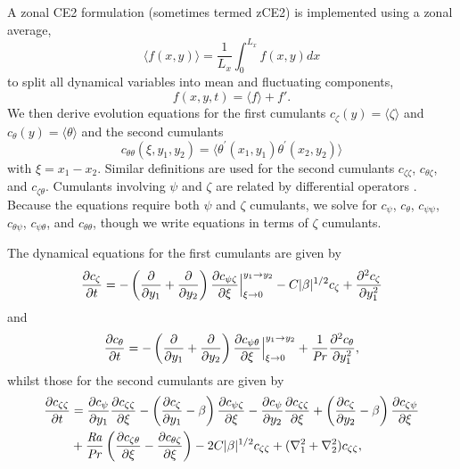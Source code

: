 \documentclass{jfm}
\newcommand{\cz}{c_{\zeta}}
\newcommand{\cs}{c_{\psi}}
\newcommand{\ct}{c_{\theta}}
\newcommand{\css}{c_{\psi \psi}}
\newcommand{\csz}{c_{\psi \zeta}}
\newcommand{\czs}{c_{\zeta \psi}}
\newcommand{\czz}{c_{\zeta \zeta}}
\newcommand{\ctz}{c_{\theta \zeta}}
\newcommand{\czt}{c_{\zeta \theta}}
\newcommand{\ctt}{c_{\theta \theta}}
\newcommand{\cst}{c_{\psi \theta}}
\newcommand{\cts}{c_{\theta \psi}}
\newcommand{\Rayleigh}{\mbox{\textit{Ra}}}  %
\begin{document}
A zonal CE2 formulation (sometimes termed zCE2) is implemented using a zonal average, 
\begin{equation}
\langle f(x,y) \rangle = \frac{1}{L_x} \int_0^{L_x} f(x,y) dx
\end{equation}
to split all dynamical variables into mean and fluctuating components,
\begin{equation}
    f(x,y,t) = \langle f \rangle + f'.
\end{equation}
We then derive evolution equations for the first cumulants $\cz(y) = \langle \zeta \rangle $ and $\ct(y) = \langle \theta \rangle$ and the second cumulants 
\begin{equation}
    \ctt(\xi,y_1,y_2) = \langle \theta^\prime(x_1,y_1) \theta^\prime(x_2,y_2) \rangle
\end{equation}
with $\xi = x_1 - x_2$.
Similar definitions are used for the second cumulants $\czz$, $\ctz$, and $\czt$. 
Cumulants involving $\psi$ and $\zeta$ are related by differential operators \citep{2013PhRvL.110j4502T}.
Because the equations require both $\psi$ and $\zeta$ cumulants, we solve for $\cs$, $\ct$, $\css$, $\cts$, $\cst$, and $\ctt$, though we write equations in terms of $\zeta$ cumulants.

The  dynamical equations for the first cumulants are given by
\begin{equation}
  \label{eq:cz}
  \pdv{\cz}{t} = - \left(\pdv{}{y_1} + \pdv{}{y_2}\right) \pdv{\csz}{\xi}\Big|_{\xi \to 0}^{y_1 \to y_2} - C |\beta|^{1/2} \cz + \pdv[2]{\cz}{y_1}
\end{equation}
and
\begin{equation}
  \label{eq:ct}
  \pdv{\ct}{t} = - \left(\pdv{}{y_1} + \pdv{}{y_2}\right) \pdv{\cst}{\xi} \Big|_{\xi \to 0}^{y_1 \to y_2} + \frac{1}{\Pran} \pdv[2]{\ct}{y_1},
\end{equation}
whilst those for the second cumulants are given by
\begin{equation}
  \label{eq:czz}
  \begin{split}
    \pdv{\czz}{t} &= \pdv{\cs}{y_1} \pdv{\czz}{\xi} - \left(\pdv{\cz}{y_1} - \beta\right) \pdv{\csz}{\xi} - \pdv{\cs}{y_2} \pdv{\czz}{\xi}  + \left(\pdv{\cz}{y_2} - \beta\right) \pdv{\czs}{\xi}\\
    &+ \frac{\Rayleigh}{\Pran} \left(\pdv{\czt}{\xi} -  \pdv{\ctz}{\xi}\right) - 2C |\beta|^{1/2} \czz + (\nabla_1^2 + \nabla_2^2) \czz,    
  \end{split}
\end{equation}
\end{document}
